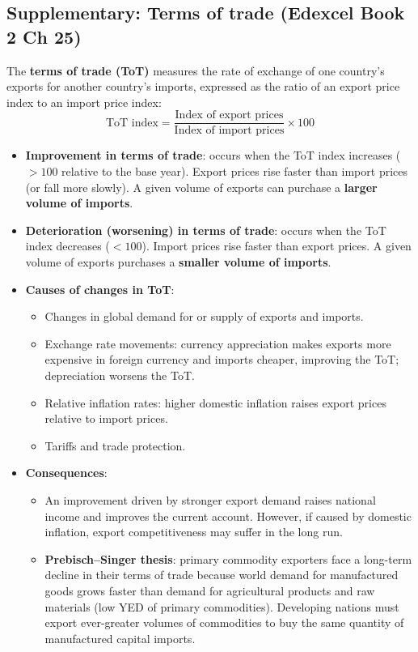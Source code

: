 \documentclass[a4paper,12pt]{article}
\newcommand{\needbold}[1]{\textcolor{red!70!black}{\textbf{#1}}}
\begin{document}
\subsection{Supplementary: Terms of trade (Edexcel Book 2 Ch 25)}
The \needbold{terms of trade (ToT)} measures the rate of exchange of one country's exports for another country's imports, expressed as the ratio of an export price index to an import price index:
\[\text{ToT index} = \dfrac{\text{Index of export prices}}{\text{Index of import prices}} \times 100\]
\begin{itemize}
  \item \textbf{Improvement in terms of trade}: occurs when the ToT index increases ($> 100$ relative to the base year). Export prices rise faster than import prices (or fall more slowly). A given volume of exports can purchase a \textbf{larger volume of imports}.
  \item \textbf{Deterioration (worsening) in terms of trade}: occurs when the ToT index decreases ($< 100$). Import prices rise faster than export prices. A given volume of exports purchases a \textbf{smaller volume of imports}.
  \item \textbf{Causes of changes in ToT}:
  \begin{itemize}
    \item Changes in global demand for or supply of exports and imports.
    \item Exchange rate movements: currency appreciation makes exports more expensive in foreign currency and imports cheaper, improving the ToT; depreciation worsens the ToT.
    \item Relative inflation rates: higher domestic inflation raises export prices relative to import prices.
    \item Tariffs and trade protection.
  \end{itemize}
  \item \textbf{Consequences}:
  \begin{itemize}
    \item An improvement driven by stronger export demand raises national income and improves the current account. However, if caused by domestic inflation, export competitiveness may suffer in the long run.
    \item \textbf{Prebisch--Singer thesis}: primary commodity exporters face a long-term decline in their terms of trade because world demand for manufactured goods grows faster than demand for agricultural products and raw materials (low YED of primary commodities). Developing nations must export ever-greater volumes of commodities to buy the same quantity of manufactured capital imports.

\end{itemize}
\end{itemize}
\end{document}
